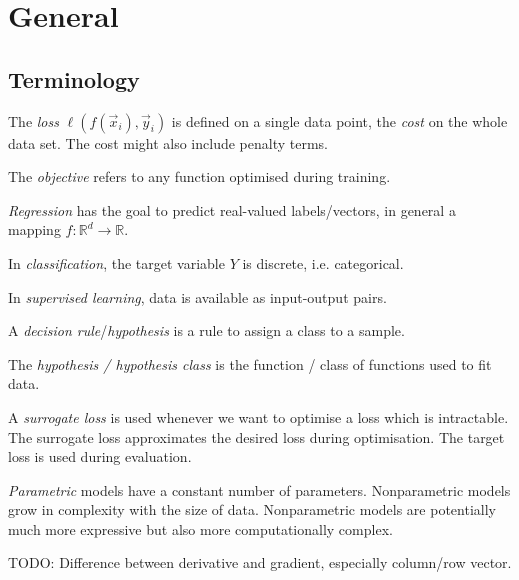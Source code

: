 \chapter{General}

\section{Terminology}
The \emph{loss} $\ell(f(\vec{x}_i), \vec{y}_i)$ is defined
on a single data point,
the \emph{cost} on the whole data set.
The cost might also include penalty terms.

The \emph{objective} refers to any function
optimised during training.

\emph{Regression} has the goal to predict real-valued
labels/vectors, in general a mapping
$f : \mathbb{R}^d \to \mathbb{R}$.

In \emph{classification}, the target variable
$Y$ is discrete, i.e. categorical.

In \emph{supervised learning}, data is available
as input-output pairs.

A \emph{decision rule}/\emph{hypothesis} is a rule
to assign a class to a sample.

The \emph{hypothesis / hypothesis class} is the
function / class of functions used to fit data.

A \emph{surrogate loss} is used whenever we want
to optimise a loss which is intractable.
The surrogate loss approximates the desired
loss during optimisation.
The target loss is used during evaluation.

\emph{Parametric} models have a constant number of parameters.
Nonparametric models grow in complexity
with the size of data.
Nonparametric models are potentially much more expressive
but also more computationally complex.


TODO: Difference between derivative and gradient,
especially column/row vector.













